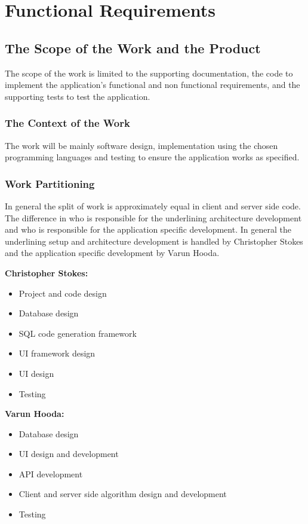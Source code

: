 \documentclass[12pt, titlepage]{article}
\begin{document}
\section{Functional Requirements}

  \subsection{The Scope of the Work and the Product}
  The scope of the work is limited to the supporting documentation, the code to
  implement the application's functional and non functional requirements, and
  the supporting tests to test the application.

    \subsubsection{The Context of the Work}
		The work will be mainly software design, implementation using the chosen
		programming languages and testing to ensure the application works as
		specified.

    \subsubsection{Work Partitioning}
		In general the split of work is approximately equal in client and server
		side code. The difference in who is responsible for the underlining
		architecture development and who is responsible for the application
		specific development. In general the underlining setup and architecture
		development is handled by Christopher Stokes and the application specific
		development by Varun Hooda.

    \textbf{Christopher Stokes:}
    \begin{itemize}
        \item Project and code design
        \item Database design
        \item SQL code generation framework
        \item UI framework design
        \item UI design
        \item Testing
    \end{itemize}


    \textbf{Varun Hooda:}
    \begin{itemize}
        \item Database design
        \item UI design and development
        \item API development
        \item Client and server side algorithm design and development
        \item Testing
    \end{itemize}
\end{document}
